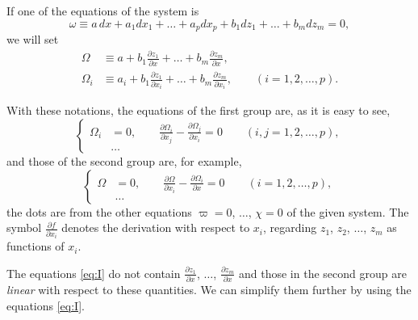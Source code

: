 \documentclass[leqno,11pt]{book}
\newcommand{\pd}{\partial}
\theoremstyle{shape1}
\theoremstyle{shapesmall}
\newcommand{\vp}{\varpi}
\begin{document}
If one of the equations of the system is
\[
\omega\equiv a\,dx+a_{1}dx_{1}+\dots+a_{p}dx_{p}+b_{1}dz_{1}+\dots+b_{m}dz_{m}=0,
\]
we will set
\begin{align*}
  \Omega&\equiv a+b_{1}\frac{\pd z_{1}}{\pd x}+\dots+b_{m}\frac{\pd z_{m}}{\pd x},\\
  \Omega_{i}&\equiv a_{i}+b_{1}\frac{\pd z_{1}}{\pd x_{i}}+\dots+b_{m}\frac{\pd z_{m}}{\pd x_{i}},\qquad (i=1,2,\dots,p).
\end{align*}

With these notations, the equations of the first group are, as it is easy to see,
\begin{equation}
  \label{eq:I}\tag{I}
  \left\{
    \begin{aligned}
      \Omega_{i}&=0,\qquad\frac{\pd\Omega_{i}}{\pd x_{j}}-\frac{\pd\Omega_{j}}{\pd x_{i}}=0\qquad (i,j=1,2,\dots,p),\\
      &\dots
    \end{aligned}
  \right.
\end{equation}
and those of the second group are, for example,
\begin{equation}
  \label{eq:II}\tag{II}
  \left\{
    \begin{aligned}
      \Omega&=0,\qquad\frac{\pd\Omega}{\pd x_{i}}-\frac{\pd\Omega_{i}}{\pd x}=0\qquad (i=1,2,\dots,p),\\
      &\dots
    \end{aligned}
  \right.
\end{equation}
the dots are from the other equations $\vp=0$, $\dots$, $\chi=0$ of the given system. The symbol $\frac{\pd f}{\pd x_{i}}$ denotes the derivation with respect to $x_{i}$, regarding $z_{1}$, $z_{2}$, $\dots$, $z_{m}$ as functions of $x_{i}$.

The equations \eqref{eq:I} do not contain $\frac{\pd z_{1}}{\pd x}$, $\dots$, $\frac{\pd z_{m}}{\pd x}$ and those in the second group are \emph{linear} with respect to these quantities. We can simplify them further by using the equations \eqref{eq:I}.
\end{document}
